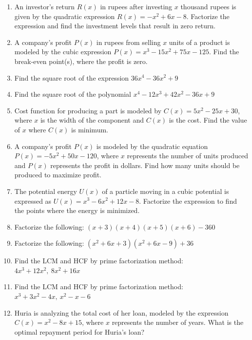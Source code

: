 \documentclass[11pt]{article}
\begin{document}
\begin{enumerate}[leftmargin=1.8cm,start=99]
\item An investor's return $R(x)$ in rupees after investing $x$ thousand rupees is given by the quadratic expression $R(x)=-x^2+6x-8$. Factorize the expression and find the investment levels that result in zero return.

\item A company's profit $P(x)$ in rupees from selling $x$ units of a product is modeled by the cubic expression $P(x)=x^3-15x^2+75x-125$. Find the break-even point(s), where the profit is zero.

\item Find the square root of the expression $36x^4-36x^2+9$

\item Find the square root of the polynomial $x^4-12x^3+42x^2-36x+9$

\item Cost function for producing a part is modeled by $C(x)=5x^2-25x+30$, where $x$ is the width of the component and $C(x)$ is the cost. Find the value of $x$ where $C(x)$ is minimum.

\item A company's profit $P(x)$ is modeled by the quadratic equation $P(x)=-5x^2+50x-120$, where $x$ represents the number of units produced and $P(x)$ represents the profit in dollars. Find how many units should be produced to maximize profit.

\item The potential energy $U(x)$ of a particle moving in a cubic potential is expressed as $U(x)=x^3-6x^2+12x-8$. Factorize the expression to find the points where the energy is minimized.

\item Factorize the following: $(x+3)(x+4)(x+5)(x+6)-360$

\item Factorize the following: $(x^2+6x+3)(x^2+6x-9)+36$

\item Find the LCM and HCF by prime factorization method: $4x^3+12x^2,\ 8x^2+16x$

\item Find the LCM and HCF by prime factorization method: $x^3+3x^2-4x,\ x^2-x-6$

\item Huria is analyzing the total cost of her loan, modeled by the expression $C(x)=x^2-8x+15$, where $x$ represents the number of years. What is the optimal repayment period for Huria's loan?


\end{enumerate}
\end{document}
